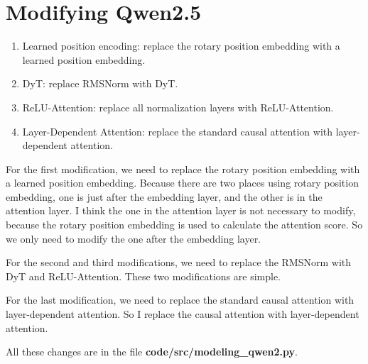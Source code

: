 \documentclass[a4paper,12pt]{article}
\begin{document}
\section{Modifying Qwen2.5}

\begin{enumerate}
    \item Learned position encoding: replace the rotary position embedding with a learned position embedding.
    \item DyT: replace RMSNorm with DyT.
    \item ReLU-Attention: replace all normalization layers with ReLU-Attention.
    \item Layer-Dependent Attention: replace the standard causal attention with layer-dependent attention.
\end{enumerate}

For the first modification, we need to replace the rotary position embedding with a learned position embedding. Because there are two places using rotary position embedding, one is just after the embedding layer, and the other is in the attention layer. I think the one in the attention layer is not necessary to modify, because the rotary position embedding is used to calculate the attention score. So we only need to modify the one after the embedding layer.

For the second and third modifications, we need to replace the RMSNorm with DyT and ReLU-Attention. These two modifications are simple.

For the last modification, we need to replace the standard causal attention with layer-dependent attention. So I replace the causal attention with layer-dependent attention. 

All these changes are in the file \textbf{code/src/modeling\_qwen2.py}.


\printbibliography[heading=bibintoc, title={References}]
\end{document}
